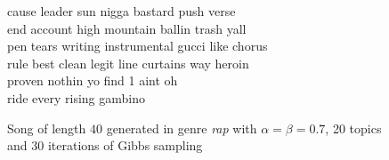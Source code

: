 \begin{figure}
\begin{mdframed}
cause leader sun nigga bastard push verse \\
end account high mountain ballin trash yall \\
pen tears writing instrumental gucci like chorus \\
rule best clean legit line curtains way heroin \\
proven nothin yo find 1 aint oh \\
ride every rising gambino
 \end{mdframed}
\caption{Song of length $40$ generated in genre \textit{rap} with $\alpha=\beta=0.7$, 20 topics and 30 iterations of Gibbs sampling}
\label{text:rap_song}
\end{figure}